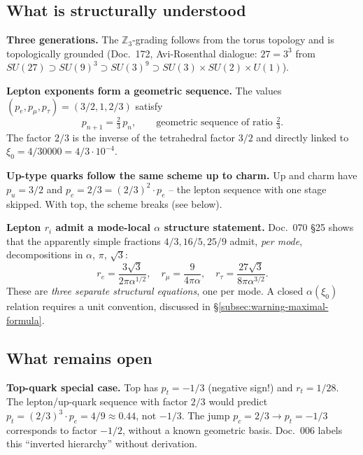 \subsection{What is structurally understood}

\textbf{Three generations.} The $\mathbb{Z}_3$-grading follows from
the torus topology and is topologically grounded (Doc.~172,
Avi-Rosenthal dialogue: $27 = 3^3$ from
$SU(27) \supset SU(9)^3 \supset SU(3)^9 \supset
SU(3) \times SU(2) \times U(1)$).

\textbf{Lepton exponents form a geometric sequence.}
The values $(p_e, p_\mu, p_\tau) = (3/2, 1, 2/3)$ satisfy
\begin{equation}
  p_{n+1} = \tfrac{2}{3}\, p_n, \qquad
  \text{geometric sequence of ratio } \tfrac{2}{3}.
\end{equation}
The factor $2/3$ is the inverse of the tetrahedral factor $3/2$
and directly linked to $\xi_0 = 4/30000 = 4/3 \cdot 10^{-4}$.

\textbf{Up-type quarks follow the same scheme up to charm.}
Up and charm have $p_u = 3/2$ and $p_c = 2/3 = (2/3)^2 \cdot p_e$
-- the lepton sequence with one stage skipped. With top, the
scheme breaks (see below).

\textbf{Lepton $r_i$ admit a mode-local $\alpha$ structure statement.}
Doc.~070 §25 shows that the apparently simple fractions $4/3, 16/5,
25/9$ admit, \emph{per mode}, decompositions in $\alpha$, $\pi$,
$\sqrt{3}$:
\begin{equation}
  r_e = \frac{3\sqrt{3}}{2\pi\alpha^{1/2}}, \quad
  r_\mu = \frac{9}{4\pi\alpha}, \quad
  r_\tau = \frac{27\sqrt{3}}{8\pi\alpha^{3/2}}.
\end{equation}
These are \emph{three separate structural equations}, one per mode.
A closed $\alpha(\xi_0)$ relation requires a unit convention,
discussed in §\ref{subsec:warning-maximal-formula}.

\subsection{What remains open}

\textbf{Top-quark special case.}
Top has $p_t = -1/3$ (negative sign!) and $r_t = 1/28$. The
lepton/up-quark sequence with factor $2/3$ would predict
$p_t = (2/3)^3 \cdot p_e = 4/9 \approx 0.44$, not $-1/3$. The jump
$p_c = 2/3 \to p_t = -1/3$ corresponds to factor $-1/2$, without a
known geometric basis. Doc.~006 labels this \enquote{inverted
hierarchy} without derivation.

